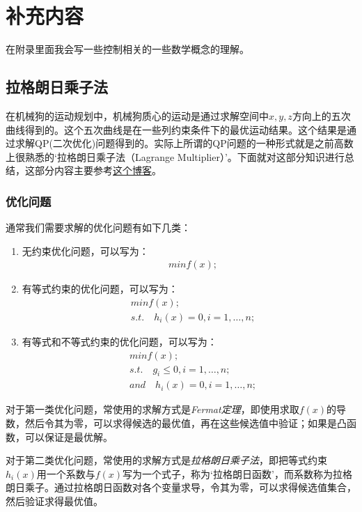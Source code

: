 
\chapter{补充内容}

在附录里面我会写一些控制相关的一些数学概念的理解。

\section{拉格朗日乘子法}

在机械狗的运动规划中，机械狗质心的运动是通过求解空间中$x, y, z$方向上的五次曲线得到的。这个五次曲线是在一些列约束条件下的最优运动结果。这个结果是通过求解QP(二次优化)问题得到的。实际上所谓的QP问题的一种形式就是之前高数上很熟悉的`拉格朗日乘子法（Lagrange Multiplier）'。下面就对这部分知识进行总结，这部分内容主要参考\href{https://juejin.cn/post/6956879956299218974}{这个博客}。

\subsection{优化问题}

通常我们需要求解的优化问题有如下几类：
\begin{enumerate}
  \item 无约束优化问题，可以写为：\begin{align*}
    &min f(x);
  \end{align*}
  \item 有等式约束的优化问题，可以写为：\begin{align*}
    &min f(x); \\ 
    &s.t. \quad h_i(x)=0, i = 1, \dots, n;
  \end{align*}
  \item 有等式和不等式约束的优化问题，可以写为：\begin{align*}
    &min f(x); \\
    &s.t. \quad g_i \leq 0, i = 1, \dots, n; \\
    &and \quad h_i(x)=0, i = 1, \dots, n;
  \end{align*}
\end{enumerate}

对于第一类优化问题，常使用的求解方式是\emph{Fermat定理}，即使用求取$f(x)$的导数，然后令其为零，可以求得候选的最优值，再在这些候选值中验证；如果是凸函数，可以保证是最优解。

对于第二类优化问题，常使用的求解方式是\emph{拉格朗日乘子法}，即把等式约束$h_i(x)$用一个系数与$f(x)$写为一个式子，称为`拉格朗日函数'，而系数称为拉格朗日乘子。通过拉格朗日函数对各个变量求导，令其为零，可以求得候选值集合，然后验证求得最优值。


